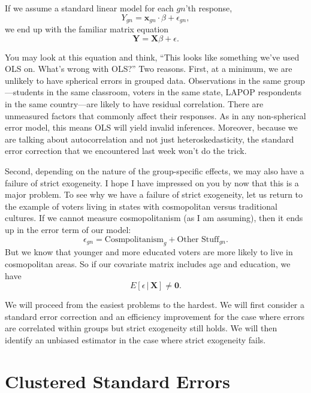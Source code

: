 \documentclass[12pt,oneside,openany]{book}
\begin{document}
If we assume a standard linear model for each \(gn\)'th response, \[
Y_{gn} = \mathbf{x}_{gn} \cdot \beta + \epsilon_{gn},
\] we end up with the familiar matrix equation \[
\mathbf{Y} = \mathbf{X} \beta + \epsilon.
\]

You may look at this equation and think, ``This looks like something
we've used OLS on. What's wrong with OLS?'' Two reasons. First, at a
minimum, we are unlikely to have spherical errors in grouped data.
Observations in the same group---students in the same classroom, voters
in the same state, LAPOP respondents in the same country---are likely to
have residual correlation. There are unmeasured factors that commonly
affect their responses. As in any non-spherical error model, this means
OLS will yield invalid inferences. Moreover, because we are talking
about autocorrelation and not just heteroskedasticity, the standard
error correction that we encountered last week won't do the trick.

Second, depending on the nature of the group-specific effects, we may
also have a failure of strict exogeneity. I hope I have impressed on you
by now that this is a major problem. To see why we have a failure of
strict exogeneity, let us return to the example of voters living in
states with cosmopolitan versus traditional cultures. If we cannot
measure cosmopolitanism (as I am assuming), then it ends up in the error
term of our model: \[
\epsilon_{gn} = \text{Cosmpolitanism}_g + \text{Other Stuff}_{gn}.
\] But we know that younger and more educated voters are more likely to
live in cosmopolitan areas. So if our covariate matrix includes age and
education, we have \[
E[\epsilon \,|\, \mathbf{X}] \neq \mathbf{0}.
\]

We will proceed from the easiest problems to the hardest. We will first
consider a standard error correction and an efficiency improvement for
the case where errors are correlated within groups but strict exogeneity
still holds. We will then identify an unbiased estimator in the case
where strict exogeneity fails.

\section{Clustered Standard Errors}\label{clustered-standard-errors}
\end{document}
